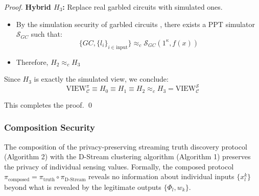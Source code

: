 \begin{proof}
\textbf{Hybrid $H_3$:} Replace real garbled circuits with simulated ones.
\begin{itemize}
    \item By the simulation security of garbled circuits \cite{lindell2009proof}, there exists a PPT simulator $\mathcal{S}_{GC}$ such that:
    \begin{equation}
    \{GC, \{l_i\}_{i \in \text{input}}\} \approx_c \mathcal{S}_{GC}(1^\kappa, f(x))
    \end{equation}
    \item Therefore, $H_2 \approx_c H_3$
\end{itemize}

Since $H_3$ is exactly the simulated view, we conclude:
\begin{equation}
\text{VIEW}_{\mathcal{C}}^{\pi} \equiv H_0 \equiv H_1 \equiv H_2 \approx_c H_3 = \text{VIEW}_{\mathcal{C}}^{\mathcal{S}}
\end{equation}

This completes the proof. \qed
\end{proof}

\subsubsection{Composition Security}

\begin{theorem}
\label{thm:composition}
The composition of the privacy-preserving streaming truth discovery protocol (Algorithm 2) with the D-Stream clustering algorithm (Algorithm 1) preserves the privacy of individual sensing values. Formally, the composed protocol $\pi_{\text{composed}} = \pi_{\text{truth}} \circ \pi_{\text{D-Stream}}$ reveals no information about individual inputs $\{x_l^k\}$ beyond what is revealed by the legitimate outputs $\{\Phi_l, w_k\}$.
\end{theorem}

